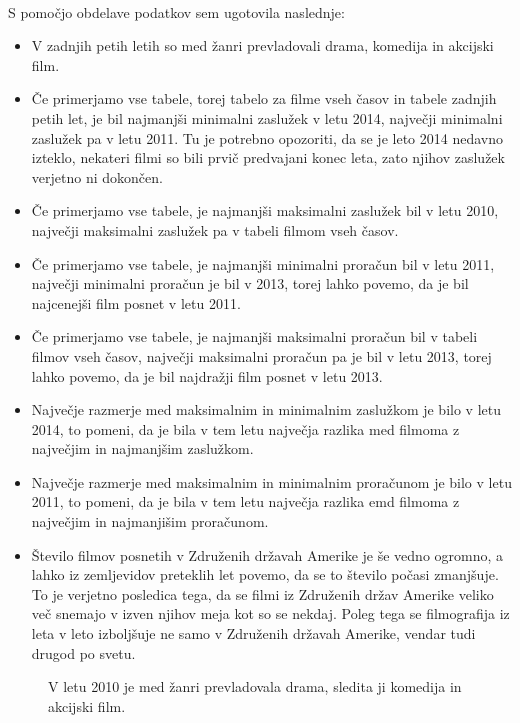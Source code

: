 \documentclass[11pt,a4paper]{article}
\begin{document}
\paragraph{}S pomočjo obdelave podatkov sem ugotovila naslednje:
\begin{itemize}
\item V zadnjih petih letih so med žanri prevladovali drama, komedija in akcijski film.
\item Če primerjamo vse tabele, torej tabelo za filme vseh časov in tabele zadnjih petih let, je bil najmanjši minimalni zaslužek v letu 2014, največji minimalni zaslužek pa v letu 2011. Tu je potrebno opozoriti, da se je leto 2014 nedavno izteklo, nekateri filmi so bili prvič predvajani konec leta, zato njihov zaslužek verjetno ni dokončen.
\item Če primerjamo vse tabele, je najmanjši maksimalni zaslužek bil v letu 2010, največji maksimalni zaslužek pa v tabeli filmom vseh časov.
\item Če primerjamo vse tabele, je najmanjši minimalni proračun bil v letu 2011, največji minimalni proračun je bil v 2013, torej lahko povemo, da je bil najcenejši film posnet v letu 2011.
\item Če primerjamo vse tabele, je najmanjši maksimalni proračun bil v tabeli filmov vseh časov, največji maksimalni proračun pa je bil v letu 2013, torej lahko povemo, da je bil najdražji film posnet v letu 2013.
\item Največje razmerje med maksimalnim in minimalnim zaslužkom je bilo v letu 2014, to pomeni, da je bila v tem letu največja razlika med filmoma z največjim in najmanjšim zaslužkom.
\item Največje razmerje med maksimalnim in minimalnim proračunom je bilo v letu 2011, to pomeni, da je bila v tem letu največja razlika emd filmoma z največjim in najmanjišim proračunom.
\item Število filmov posnetih v Združenih državah Amerike je še vedno ogromno, a lahko iz zemljevidov preteklih let povemo, da se to število počasi zmanjšuje. To je verjetno posledica tega, da se filmi iz Združenih držav Amerike veliko več snemajo v izven njihov meja kot so se nekdaj. Poleg tega se filmografija iz leta v leto izboljšuje ne samo v Združenih državah Amerike, vendar tudi drugod po svetu. 
\end{itemize}


\pagebreak
\begin{figure}[H]

\caption{V letu 2010 je med žanri prevladovala drama, sledita ji komedija in akcijski film.}
\end{figure}
\end{document}
